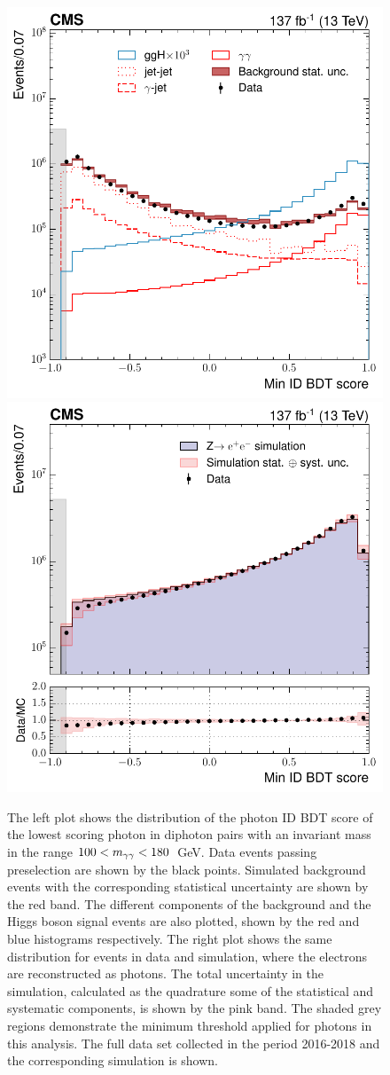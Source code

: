\begin{figure}[htb!]
  \centering
  \includegraphics[width=.49\textwidth]{Figures/hgg_overview/DiphoBDT_minIDMVA_logPlot.pdf}
  \includegraphics[width=.49\textwidth]{Figures/hgg_overview/DYValidation_DiphoBDT_RatioPlot_minIDMVA_logPlot.pdf}
  \caption[Photon ID output score distributions]
  {
    The left plot shows the distribution of the photon ID BDT score of the lowest scoring photon in diphoton pairs with an invariant mass in the range $100<m_{\gamma\gamma}<180$~GeV. Data events passing preselection are shown by the black points. Simulated background events with the corresponding statistical uncertainty are shown by the red band. The different components of the background and the Higgs boson signal events are also plotted, shown by the red and blue histograms respectively. The right plot shows the same distribution for \Zee events in data and simulation, where the electrons are reconstructed as photons. The total uncertainty in the simulation, calculated as the quadrature some of the statistical and systematic components, is shown by the pink band. The shaded grey regions demonstrate the minimum threshold applied for photons in this analysis. The full data set collected in the period 2016-2018 and the corresponding simulation is shown.
  }
  \label{fig:photon_id_1}
\end{figure}

